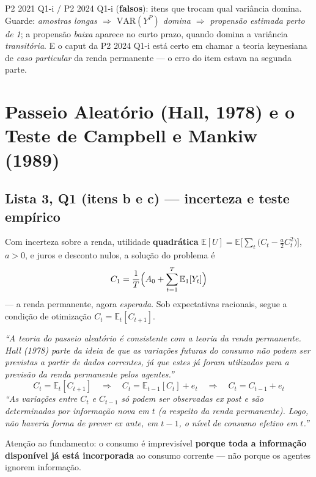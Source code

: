 \documentclass[12pt, a4paper]{article}
\newcommand{\E}{\mathbb{E}}
\newcommand{\VAR}{\mathrm{VAR}}
\begin{document}
\begin{provabox}[title={Como cai na prova}]
P2 2021 Q1-i / P2 2024 Q1-i (\textbf{falsos}): itens que trocam qual variância
domina. Guarde: \emph{amostras longas $\Rightarrow$ $\VAR(Y^P)$ domina
$\Rightarrow$ propensão estimada perto de 1}; a propensão \emph{baixa} aparece
no curto prazo, quando domina a variância \emph{transitória}. E o caput da
P2 2024 Q1-i está certo em chamar a teoria keynesiana de \emph{caso
particular} da renda permanente --- o erro do item estava na segunda parte.
\end{provabox}

\section{Passeio Aleatório (Hall, 1978) e o Teste de Campbell e Mankiw (1989)}

\subsection{Lista 3, Q1 (itens b e c) --- incerteza e teste empírico}

Com incerteza sobre a renda, utilidade \textbf{quadrática}
$\E[U] = \E\bigl[\sum_{t}\bigl(C_t - \tfrac{a}{2}C_t^2\bigr)\bigr]$, $a>0$, e
juros e desconto nulos, a solução do problema é
\[
C_1 = \frac{1}{T}\Bigl(A_0 + \sum_{t=1}^{T}\E_1[Y_t]\Bigr)
\]
--- a renda permanente, agora \emph{esperada}. Sob expectativas racionais,
segue a condição de otimização $C_t = \E_t[C_{t+1}]$.

\begin{correctbox}[title={Chave oficial (Q1b): a lógica de Hall}]
\emph{``A teoria do passeio aleatório é consistente com a teoria da renda
permanente. Hall (1978) parte da ideia de que as variações futuras do consumo
não podem ser previstas a partir de dados correntes, já que estes já foram
utilizados para a previsão da renda permanente pelos agentes.''}
\[
C_t = \E_t[C_{t+1}]
\quad\Longrightarrow\quad
C_t = \E_{t-1}[C_t] + e_t
\quad\Longrightarrow\quad
\boxed{C_t = C_{t-1} + e_t}
\]
\emph{``As variações entre $C_t$ e $C_{t-1}$ só podem ser observadas ex post e
são determinadas por informação nova em $t$ (a respeito da renda permanente).
Logo, não haveria forma de prever ex ante, em $t-1$, o nível de consumo efetivo
em $t$.''}

Atenção ao fundamento: o consumo é imprevisível \textbf{porque toda a
informação disponível já está incorporada} ao consumo corrente --- não porque
os agentes ignorem informação.
\end{correctbox}
\end{document}
